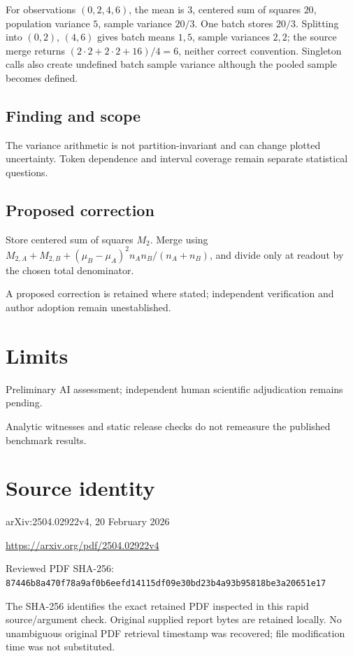 \documentclass[11pt]{article}
\begin{document}
For observations \((0,2,4,6)\), the mean is \(3\), centered sum of squares \(20\), population variance \(5\), sample variance \(20/3\). One batch stores \(20/3\). Splitting into \((0,2)\), \((4,6)\) gives batch means \(1,5\), sample variances \(2,2\); the source merge returns \((2\cdot2+2\cdot2+16)/4=6\), neither correct convention. Singleton calls also create undefined batch sample variance although the pooled sample becomes defined.

\subsection*{Finding and scope}

The variance arithmetic is not partition-invariant and can change plotted uncertainty. Token dependence and interval coverage remain separate statistical questions.

\subsection*{Proposed correction}

Store centered sum of squares \(M_2\). Merge using \(M_{2,A}+M_{2,B}+(\mu_B-\mu_A)^2n_An_B/(n_A+n_B)\), and divide only at readout by the chosen total denominator.

A proposed correction is retained where stated; independent verification and author adoption remain unestablished.

\section*{Limits}

Preliminary AI assessment; independent human scientific adjudication remains pending.\par

Analytic witnesses and static release checks do not remeasure the published benchmark results.\par

\section*{Source identity}

arXiv:2504.02922v4, 20 February 2026

\url{https://arxiv.org/pdf/2504.02922v4}

Reviewed PDF SHA-256: \nolinkurl{87446b8a470f78a9af0b6eefd14115df09e30bd23b4a93b95818be3a20651e17}

The SHA-256 identifies the exact retained PDF inspected in this rapid source/argument check. Original supplied report bytes are retained locally. No unambiguous original PDF retrieval timestamp was recovered; file modification time was not substituted.
\end{document}
